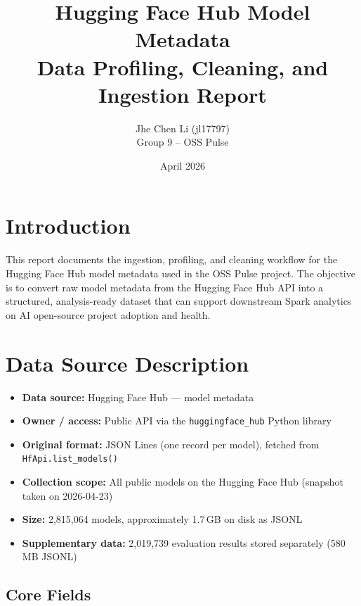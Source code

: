 \documentclass[11pt]{article}
\title{Hugging Face Hub Model Metadata\\Data Profiling, Cleaning, and Ingestion Report}
\author{Jhe Chen Li (jl17797)\\Group 9 -- OSS Pulse}
\date{April 2026}
\begin{document}
\maketitle

\section{Introduction}

This report documents the ingestion, profiling, and cleaning workflow for the Hugging Face Hub model metadata used in the OSS Pulse project. The objective is to convert raw model metadata from the Hugging Face Hub API into a structured, analysis-ready dataset that can support downstream Spark analytics on AI open-source project adoption and health.

\section{Data Source Description}

\begin{itemize}
  \item \textbf{Data source:} Hugging Face Hub --- model metadata
  \item \textbf{Owner / access:} Public API via the \texttt{huggingface\_hub} Python library
  \item \textbf{Original format:} JSON Lines (one record per model), fetched from \texttt{HfApi.list\_models()}
  \item \textbf{Collection scope:} All public models on the Hugging Face Hub (snapshot taken on 2026-04-23)
  \item \textbf{Size:} 2,815,064 models, approximately 1.7\,GB on disk as JSONL
  \item \textbf{Supplementary data:} 2,019,739 evaluation results stored separately (580\,MB JSONL)
\end{itemize}

\subsection{Core Fields}
\end{document}
